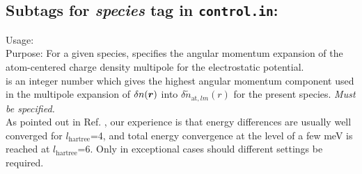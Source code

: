 \newpage



\subsection*{Subtags for \emph{species} tag in \texttt{control.in}:}

{
  \noindent
  Usage:   \\[1.0ex]
  Purpose: For a given species, specifies the angular momentum
    expansion of the atom-centered charge density multipole for the
    electrostatic potential. \\[1.0ex]
   is an integer number which gives the highest angular
    momentum component used in the multipole expansion of $\delta
    n(\mbox{\boldmath$r$})$ into $\delta\tilde{n}_{\text{at},lm}(r)$ for the
    present species. \emph{Must be specified.} \\
}
As pointed out in
Ref. \cite{Blum08}, our experience is that energy differences are
usually well converged for $l_\text{hartree}$=4, and total energy
convergence at the level of a few meV is reached at
$l_\text{hartree}$=6. Only in exceptional cases should different
settings be required. 
